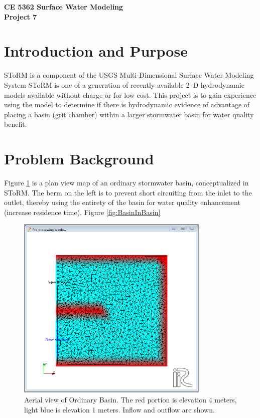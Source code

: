 \documentclass[12pt]{article}
\begin{document}
\begin{center}
{\textbf{{ CE 5362 Surface Water Modeling} \\ {Project 7}}}
\end{center}

\section*{{Introduction and Purpose}}
SToRM is a component of the USGS Multi-Dimensional Surface Water Modeling System \citep{mdswms2012}
SToRM is one of a generation of recently available 2--D hydrodynamic models available without charge or for low cost. 
This project is to gain experience using the model to determine if there is hydrodynamic evidence of advantage of placing a basin (grit chamber) within a larger stormwater basin for water quality benefit.


\section*{{Problem Background}}
Figure \ref{fig:OrdinaryBasin} is a plan view map of an ordinary stormwater basin, conceptualized in SToRM.  The berm on the left is to prevent short circuiting from the inlet to the outlet, thereby using the entirety of the basin for water quality enhancement (increase residence time).
Figure \ref{fig:BasinInBasin}

\begin{figure}[h!] %
   \centering
   \includegraphics[height=3.5in]{OrdinaryBasin.png} 
   \caption{Aerial view of Ordinary Basin.   The red portion is elevation 4 meters, light blue is elevation 1 meters.  Inflow and outflow are shown.}
   \label{fig:OrdinaryBasin}
\end{figure}
\end{document}
